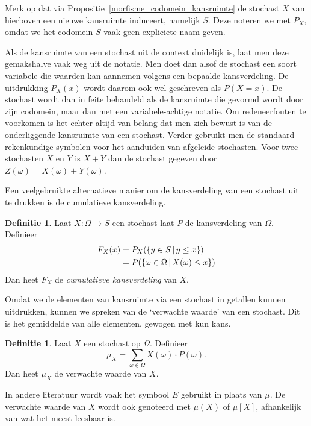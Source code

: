 \documentclass[a4paper]{book}
\theoremstyle{definition}
\newtheorem{definition}[theorem]{Definitie}
\begin{document}
Merk op dat via Propositie~\ref{morfisme_codomein_kansruimte} de stochast $X$ van hierboven een nieuwe kansruimte induceert, namelijk $S$. Deze
noteren we met $P_X$, omdat we het codomein $S$ vaak geen expliciete naam geven.

Als de kansruimte van een stochast uit de context duidelijk is, laat men deze gemakshalve vaak weg uit de notatie.
Men doet dan alsof de stochast een soort variabele die waarden kan aannemen volgens een bepaalde kansverdeling.
De uitdrukking $P_X(x)$ wordt daarom ook wel geschreven als $P(X=x)$.
De stochast wordt dan in feite behandeld als de kansruimte die gevormd wordt door zijn codomein, maar dan met een variabele-achtige notatie.
Om redeneerfouten te voorkomen is het echter altijd van belang dat men zich bewust is van de onderliggende kansruimte van een stochast.
Verder gebruikt men de standaard rekenkundige symbolen voor het aanduiden van afgeleide stochasten. Voor twee stochasten $X$ en $Y$ is $X+Y$ dan de
stochast gegeven door $Z(\omega) = X(\omega) + Y(\omega)$.

Een veelgebruikte alternatieve manier om de kansverdeling van een stochast uit te drukken is de cumulatieve kansverdeling.
\begin{definition}
    Laat $X : \Omega \to S$ een stochast laat $P$ de kansverdeling van $\Omega$.
    Definieer
    \begin{align*}
        F_X(x) &= P_X(\set{y \in S}{y \leq x}) \\
               &= P(\set{\omega \in \Omega}{X(\omega) \leq x})
    \end{align*}
    Dan heet $F_X$ de \emph{cumulatieve kansverdeling} van $X$.
\end{definition}


Omdat we de elementen van kansruimte via een stochast in getallen kunnen uitdrukken, kunnen we spreken van de `verwachte waarde' van een stochast.
Dit is het gemiddelde van alle elementen, gewogen met kun kans.

\begin{definition}
    Laat $X$ een stochast op $\Omega$.
    Definieer \[ \mu_X = \sum_{\omega \in \Omega} X(\omega) \cdot P(\omega). \]
    Dan heet $\mu_X$ de verwachte waarde van $X$.
\end{definition}

In andere literatuur wordt vaak het symbool $E$ gebruikt in plaats van $\mu$.
De verwachte waarde van $X$ wordt ook genoteerd met $\mu(X)$ of $\mu[X]$, afhankelijk van wat het meest leesbaar is.
\end{document}
